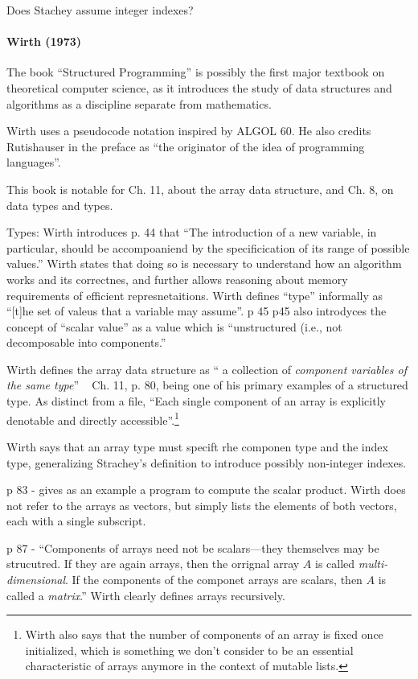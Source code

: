 Does Stachey assume integer indexes?


\paragraph{Wirth (1973)~\cite{Wirth1973}}

The book ``Structured Programming'' is possibly the first major textbook on theoretical computer science, as it introduces the study of data structures and algorithms as a discipline separate from mathematics.

Wirth uses a pseudocode notation inspired by ALGOL 60. He also credits Rutishauser
in the preface as ``the originator of the idea of programming languages''.

This book is notable for Ch. 11, about the array data structure, and Ch. 8, on data types and types.

Types: Wirth introduces p. 44 that ``The introduction of a new variable, in particular,
should be accompoaniend by the specificication of
its range of possible values.'' Wirth states that doing so is necessary to understand
how an algorithm works and its correctnes, and further allows reasoning about memory requirements
of efficient represnetaitions.
Wirth defines ``type'' informally as ``[t]he set of valeus that a variable may assume''. p 45
p45 also introdyces the concept of ``scalar value'' as a value which is ``unstructured (i.e., not decomposable into components.''


Wirth defines the array data structure as `` a collection of \textit{component variables of the same type}'' ~ Ch. 11, p. 80, being one of his primary examples of a structured type. As distinct from a file, ``Each single component of an array is explicitly denotable and directly accessible''.\footnote{Wirth also says that the number of
components of an array is fixed once initialized, which is something we don't
consider to be an essential characteristic of arrays anymore in the context of
mutable lists.}

Wirth says that an array type must specift rhe componen type and the index type,
generalizing Strachey's definition to introduce possibly non-integer indexes.

p 83 - gives as an example a program to compute the scalar product.
Wirth does not refer to the arrays as vectors, but simply lists the elements of
both vectors, each with a single subscript.

p 87 - ``Components of arrays need not be scalars---they themselves may be strucutred.
If they are again arrays, then the orrignal array $A$ is called \textit{multi-dimensional}.
If the components of the componet arrays are scalars, then
$A$ is called a \textit{matrix}.'' Wirth clearly defines arrays recursively.



